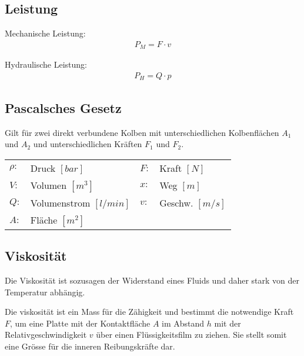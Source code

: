 \subsection{Leistung}
Mechanische Leistung:
\begin{align*}
P_M = F \cdot v
\end{align*}

Hydraulische Leistung:
\begin{align*}
P_H = Q \cdot p
\end{align*}


%




\subsection{Pascalsches Gesetz}
Gilt für zwei direkt verbundene Kolben mit unterschiedlichen Kolbenflächen $A_1$ und $A_2$ und unterschiedlichen Kräften $F_1$ und $F_2$.
\begin{tabular}{llll}
$\rho:$ & Druck $[bar]$ & $F:$ & Kraft $[N]$ \\
$V:$ & Volumen $[m^3]$ & $x:$ & Weg $[m]$ \\
$Q:$ & Volumenstrom $[l/min]$ & $v:$ & Geschw. $[m/s]$\\
$A:$ & Fläche $[m^2]$
\end{tabular}

\vfill
\columnbreak
\subsection{Viskosität}
Die Viskosität ist sozusagen der Widerstand eines Fluids und daher stark von der Temperatur abhängig.


Die viskosität ist ein Mass für die Zähigkeit und bestimmt die notwendige Kraft $F$, um eine Platte mit der Kontaktfläche $A$ im Abstand $h$ mit der Relativgeschwindigkeit $v$ über einen Flüssigkeitsfilm zu ziehen. Sie stellt somit eine Grösse für die inneren Reibungskräfte dar.

